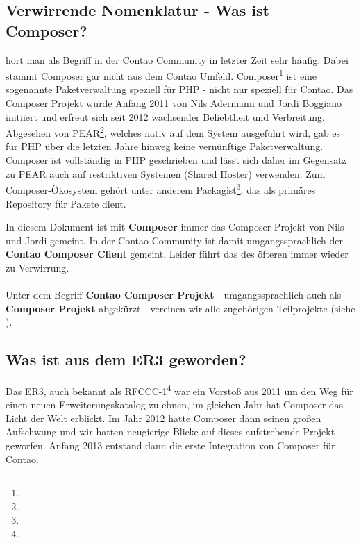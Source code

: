 \documentclass[
paper=a4,
draft=false,%
fontsize=10pt%
]{scrartcl}
\begin{document}
\subsection{Verwirrende Nomenklatur - Was ist Composer?}

 hört man als Begriff in der Contao Community in letzter Zeit sehr häufig. Dabei stammt Composer gar nicht aus dem Contao Umfeld. Composer\footnote{} ist eine sogenannte Paketverwaltung speziell für PHP - nicht nur speziell für Contao. Das Composer Projekt wurde Anfang 2011 von Nils Adermann und Jordi Boggiano initiiert und erfreut sich seit 2012 wachsender Beliebtheit und Verbreitung. Abgesehen von PEAR\footnote{}, welches nativ auf dem System ausgeführt wird, gab es für PHP über die letzten Jahre hinweg keine vernünftige Paketverwaltung. Composer ist vollständig in PHP geschrieben und lässt sich daher im Gegensatz zu PEAR auch auf restriktiven Systemen (Shared Hoster) verwenden. Zum Composer-Ökosystem gehört unter anderem Packagist\footnote{}, das als primäres Repository für Pakete dient.

\begin{info}
In diesem Dokument ist mit \textbf{Composer} immer das Composer Projekt von Nils und Jordi gemeint.
In der Contao Community ist damit umgangssprachlich der \textbf{Contao Composer Client} gemeint.
Leider führt das des öfteren immer wieder zu Verwirrung. \\
\\
Unter dem Begriff \textbf{Contao Composer Projekt} - umgangssprachlich auch als \textbf{Composer Projekt} abgekürzt - vereinen wir alle zugehörigen Teilprojekte (siehe ).
\end{info}

\subsection{Was ist aus dem ER3 geworden?}

Das ER3, auch bekannt als RFCCC-1\footnote{} war ein Vorstoß aus 2011 um den Weg für einen neuen Erweiterungskatalog zu ebnen, im gleichen Jahr hat Composer das Licht der Welt erblickt. Im Jahr 2012 hatte Composer dann seinen großen Aufschwung und wir hatten neugierige Blicke auf dieses aufstrebende Projekt geworfen. Anfang 2013 entstand dann die erste Integration von Composer für Contao.
\end{document}
